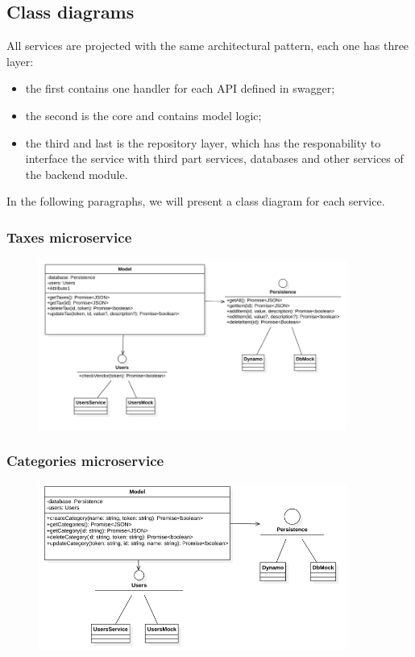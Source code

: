 \subsection{Class diagrams}
All services are projected with the same architectural pattern, each one has three layer:
\begin{itemize}
    \item the first contains one handler for each API defined in swagger;
    \item the second is the core and contains model logic;
    \item the third and last is the repository layer, which has the responability to interface the
          service with third part services, databases and other services of the backend module.
\end{itemize}
In the following paragraphs, we will present a class diagram for each service.

\subsubsection{Taxes microservice}
\begin{figure}[H]
    \includegraphics[width=0.9\textwidth]{res/images/class-diagrams/taxes.png}
\end{figure}

\subsubsection{Categories microservice}
\begin{figure}[H]
    \includegraphics[width=0.9\textwidth]{res/images/class-diagrams/categories.png}
\end{figure}

